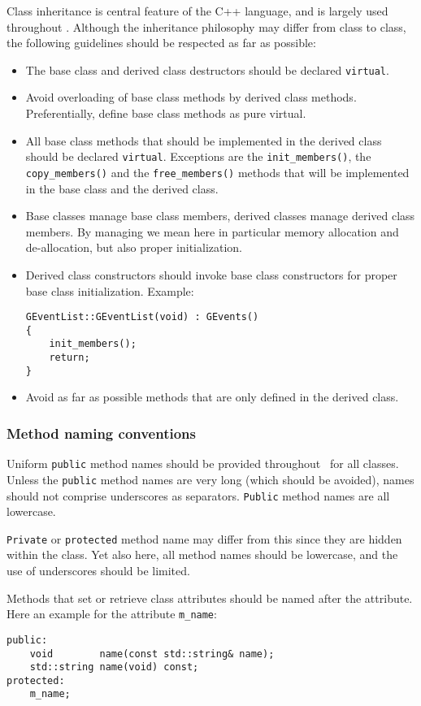 \documentclass{article}[12pt,a4]
\begin{document}
Class inheritance is central feature of the C++ language, and is largely used throughout \this.
Although the inheritance philosophy may differ from class to class, the following guidelines
should be respected as far as possible:
\begin{itemize}
\item The base class and derived class destructors should be declared {\tt virtual}.
\item Avoid overloading of base class methods by derived class methods. 
Preferentially, define base class methods as pure virtual.
\item All base class methods that should be implemented in the derived class should
be declared {\tt virtual}.
Exceptions are the {\tt init\_members()}, the {\tt copy\_members()} and the {\tt free\_members()}
methods that will be implemented in the base class and the derived class.
\item Base classes manage base class members, derived classes manage derived class
members. 
By managing we mean here in particular memory allocation and de-allocation,
but also proper initialization.
\item Derived class constructors should invoke base class constructors for proper
base class initialization. Example:
\begin{verbatim}
GEventList::GEventList(void) : GEvents()
{
    init_members();
    return;
}
\end{verbatim}
\item Avoid as far as possible methods that are only defined in the derived class.
\end{itemize}


\subsubsection{Method naming conventions}

Uniform {\tt public} method names should be provided throughout \this\ for all classes.
Unless the {\tt public} method names are very long (which should be avoided), names
should not comprise underscores as separators.
{\tt Public} method names are all lowercase.

{\tt Private} or {\tt protected} method name may differ from this since they are hidden within 
the class.
Yet also here, all method names should be lowercase, and the use of underscores
should be limited.

Methods that set or retrieve class attributes should be named after the attribute.
Here an example for the attribute {\tt m\_name}:
\begin{verbatim}
public:
    void        name(const std::string& name);
    std::string name(void) const;
protected:
    m_name;
\end{verbatim}
\end{document}
